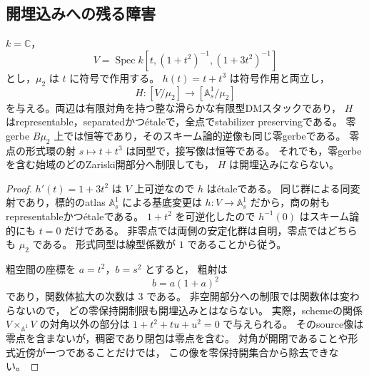 \subsection{開埋込みへの残る障害}

\begin{example}
\label{ex:etale-shadow-not-open-immersion}
$k=\mathbb C$，
\[
 V=\operatorname{Spec}k[t,(1+t^2)^{-1},(1+3t^2)^{-1}]
\]
とし，$\mu_2$ は $t$ に符号で作用する。
$h(t)=t+t^3$ は符号作用と両立し，
\[
 H:[V/\mu_2]\longrightarrow[\mathbb A^1_s/\mu_2]
\]
を与える。両辺は有限対角を持つ整な滑らかな有限型DMスタックであり，
$H$ はrepresentable，separatedかつ\'{e}taleで，全点でstabilizer preservingである。
零gerbe $B\mu_2$ 上では恒等であり，そのスキーム論的逆像も同じ零gerbeである。
零点の形式環の射 $s\mapsto t+t^3$ は同型で，接写像は恒等である。
それでも，零gerbeを含む始域のどのZariski開部分へ制限しても，
$H$ は開埋込みにならない。
\end{example}
\begin{proof}
$h'(t)=1+3t^2$ は $V$ 上可逆なので $h$ は\'{e}taleである。
同じ群による同変射であり，標的のatlas $\mathbb A^1_s$ による基底変更は
$h:V\to\mathbb A^1_s$ だから，商の射もrepresentableかつ\'{e}taleである。
$1+t^2$ を可逆化したので $h^{-1}(0)$ はスキーム論的にも $t=0$ だけである。
非零点では両側の安定化群は自明，零点ではどちらも $\mu_2$ である。
形式同型は線型係数が $1$ であることから従う。

粗空間の座標を $a=t^2$，$b=s^2$ とすると，
粗射は
\[
 b=a(1+a)^2
\]
であり，関数体拡大の次数は $3$ である。
非空開部分への制限では関数体は変わらないので，
どの零保持開制限も開埋込みとはならない。
実際，schemeの関係 $V\times_{\mathbb A^1}V$ の対角以外の部分は
$1+t^2+tu+u^2=0$ で与えられる。
そのsource像は零点を含まないが，稠密であり閉包は零点を含む。
対角が開閉であることや形式近傍が一つであることだけでは，
この像を零保持開集合から除去できない。
\end{proof}

